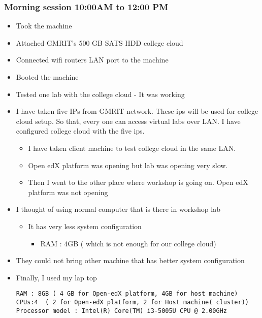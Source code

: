 \documentclass[11pt]{article}
\begin{document}
\subsubsection{Morning session 10:00AM to 12:00 PM}
\label{sec-3-2-1}
\begin{itemize}
\item Took the machine
\item Attached GMRIT's 500 GB SATS HDD college cloud
\item Connected wifi routers LAN port to the machine
\item Booted the machine
\item Tested one lab with the college cloud - It was working

\item I have taken five IPs from GMRIT network. These ips will be used
for college cloud setup. So that, every one can access virtual
labs over LAN. I have configured college cloud with the five
ips.
\begin{itemize}
\item I have taken client machine to test college cloud in the same
LAN.
\item Open edX platform was opening but lab was opening very slow.
\item Then I went to the other place where workshop is going
on. Open edX platform was not opening
\end{itemize}

\item I thought of using normal computer that is there in workshop lab
\begin{itemize}
\item It has very less system configuration
\begin{itemize}
\item RAM : 4GB ( which is not enough for our college cloud)
\end{itemize}
\end{itemize}
\item They could not bring other machine that has better system
configuration

\item Finally, I used my lap top
\begin{verbatim}
RAM : 8GB ( 4 GB for Open-edX platform, 4GB for host machine)
CPUs:4  ( 2 for Open-edX platform, 2 for Host machine( cluster))
Processor model : Intel(R) Core(TM) i3-5005U CPU @ 2.00GHz
\end{verbatim}
\end{itemize}
\end{document}
